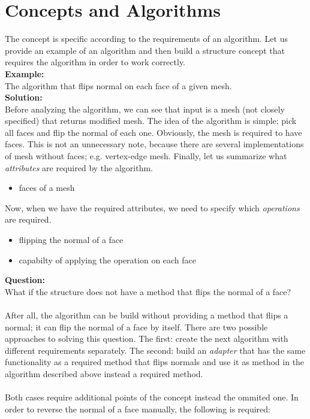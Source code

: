 \section{Concepts and Algorithms}

The concept is specific according to the requirements of an algorithm. Let us provide an example
of an algorithm and then build a structure concept that requires the algorithm in order to work 
correctly.\\

\textbf{Example:}\\
The algorithm that flips normal on each face of a given mesh.\\

\textbf{Solution:}\\
Before analyzing the algorithm, we can see that input is a mesh (not closely specified)
that returns modified mesh. The idea of the algorithm is simple; pick all faces
and flip the normal of each one. Obviously, the mesh is required to have faces. This is not an
unnecessary note, because there are several implementations of mesh without faces; e.g.
vertex-edge mesh. Finally, let us summarize what \emph{attributes} are required by the algorithm.

\begin{itemize}
\item faces of a mesh
\end{itemize}

Now, when we have the required attributes, we need to specify which \emph{operations} are required.

\begin{itemize}
\item flipping the normal of a face 
\item capabilty of applying the operation on each face
\end{itemize}

\textbf{Question:}\\
What if the structure does not have a method that flips the normal of a face?\\
\\
After all, the algorithm can be build without providing a method that flips a normal;
it can flip the normal of a face by itself.
There are two possible approaches to solving this question. The first: create the
next algorithm with different requirements separately. The second: build an \emph{adapter} that
has the same functionality as a required method that flips normals and use it as method
in the algorithm described above instead a required method.\\
\\
Both cases require additional points of the concept instead the ommited one.
In order to reverse the normal of a face manually, the following is required:

